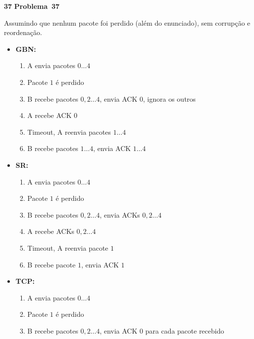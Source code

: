 \documentclass{article}
\newcounter{exe-list}
\newenvironment{exe-list}
    {\begin{list}{\alph{exe-list}.}{\usecounter{exe-list}}}
    {\end{list}}
\newenvironment{exe}[2][Problema]
    {\newcommand{\opt}{(Opcional)}%
    \newcommand{\sketch}[1]{{\bfseries Rascunho:} ##1}%
    \medskip\par\noindent\ifthenelse{\equal{#1}{}}
        {\textbf{\large #2}}
        {\textbf{\large #1~#2}}%
    \medskip\par\noindent}
    {\medskip}
\begin{document}
\begin{exe}{37}
    \begin{exe-list}
    \item
        Assumindo que nenhum pacote foi perdido
        (além do enunciado),
        sem corrupção e reordenação.
        \begin{itemize}
            \item \textbf{GBN:}
                \begin{enumerate}
                    \item A envia pacotes \(0 \dots 4\)
                    \item Pacote \(1\) é perdido
                    \item B recebe pacotes \(0, 2 \dots 4\),
                        envia ACK \(0\), ignora os outros
                    \item A recebe ACK \(0\)
                    \item Timeout, A reenvia pacotes \(1 \dots 4\)
                    \item B recebe pacotes \(1 \dots 4\),
                        envia ACK \(1 \dots 4\)
                \end{enumerate}
            \item \textbf{SR:}
                \begin{enumerate}
                    \item A envia pacotes \(0 \dots 4\)
                    \item Pacote \(1\) é perdido
                    \item B recebe pacotes \(0, 2 \dots 4\),
                        envia ACKs \(0, 2 \dots 4\)
                    \item A recebe ACKs \(0, 2 \dots 4\)
                    \item Timeout, A reenvia pacote \(1\)
                    \item B recebe pacote \(1\),
                        envia ACK \(1\)
                \end{enumerate}
            \item \textbf{TCP:}
                \begin{enumerate}
                    \item A envia pacotes \(0 \dots 4\)
                    \item Pacote \(1\) é perdido
                    \item B recebe pacotes \(0, 2 \dots 4\),
                        envia ACK \(0\) para cada pacote recebido

\end{enumerate}
\end{itemize}
\end{exe-list}
\end{exe}
\end{document}
